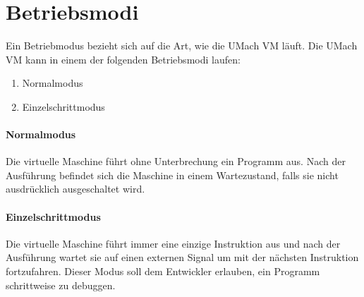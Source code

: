 \section{Betriebsmodi}
Ein Betriebmodus bezieht sich auf die Art, wie die UMach VM läuft.
Die UMach VM kann in einem der folgenden Betriebsmodi laufen:

\begin{enumerate}
  \item Normalmodus
  \item Einzelschrittmodus
\end{enumerate}

\paragraph{Normalmodus} Die virtuelle Maschine führt ohne Unterbrechung ein
Programm aus. Nach der Ausführung befindet sich die Maschine in einem
Wartezustand, falls sie nicht ausdrücklich ausgeschaltet wird.

\paragraph{Einzelschrittmodus} Die virtuelle Maschine führt immer eine einzige
Instruktion aus und nach der Ausführung wartet sie auf einen externen Signal um
mit der nächsten Instruktion fortzufahren. Dieser Modus soll dem Entwickler
erlauben, ein Programm schrittweise zu debuggen.


